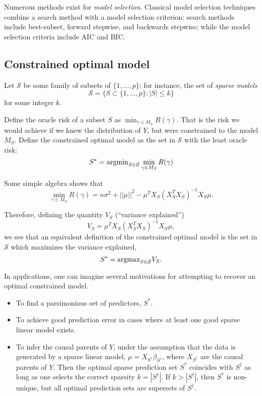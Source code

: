 \documentclass[12pt]{article}
\begin{document}
Numerous methods exist for \emph{model selection}. Classical model
selection techniques combine a search method with a model selection
criterion: search methods include best-subset, forward stepwise, and
backwards stepwise; while the model selection criteria include AIC and
BIC.

\subsection{Constrained optimal model}

Let $\mathcal{S}$ be some family of subsets of $\{1,\hdots, p\}$;
for instance, the set of \emph{sparse models}
$$
\mathcal{S} = \{S \subset\{1,\hdots, p\}: |S| \leq k\}
$$
for some integer $k$.

Define the oracle risk of a subset $S$ as $\min_{\gamma \in M_S} R(\gamma)$.
That is the risk we would achieve if we knew the distribution of $Y$, but were constrained to the model $M_S$.
Define the constrained optimal model as the set in $\mathcal{S}$ with the least oracle risk:
\[
S^* = \text{argmin}_{S \in \mathcal{S}} \min_{\gamma \in M_S} R(\gamma)
\]

Some simple algebra shows that
\[
\min_{\gamma \in M_S} R(\gamma) = n\sigma^2 + ||\mu||^2 - \mu^T X_S (X_S^T X_S)^{-1} X_S \mu.
\]

Therefore, defining the quantity $V_S$ (``variance explained'')
$$
V_S = \mu^T X_S (X_S^T X_S)^{-1} X_S \mu,
$$
we see that an equivalent definition of the constrained optimal model
is the set in $\mathcal{S}$ which maximizes the variance explained,
$$
S^* = \text{argmax}_{S \in \mathcal{S}} V_S.
$$

In applications, one can imagine several motivations for attempting to recover an optimal constrained model.
\begin{itemize}
\item To find a parsimonious set of predictors, $S^*$.
\item To achieve good prediction error in cases where at least one good sparse linear model exists.
\item To infer the causal parents of $Y$, under the assumption that the data is generated by a sparse linear model, $\mu = X_{S^\dagger} \beta_{S^\dagger}$, where $X_{S^\dagger}$ are the causal parents of $Y$.
Then the optimal sparse prediction set $S^*$ coincides with
$S^\dagger$ as long as one selects the correct sparsity $k =
|S^\dagger|$.  If $k > |S^\dagger|$, then $S^*$ is non-unique, but all
optimal prediction sets are supersets of $S^\dagger$.
\end{itemize}
\end{document}
